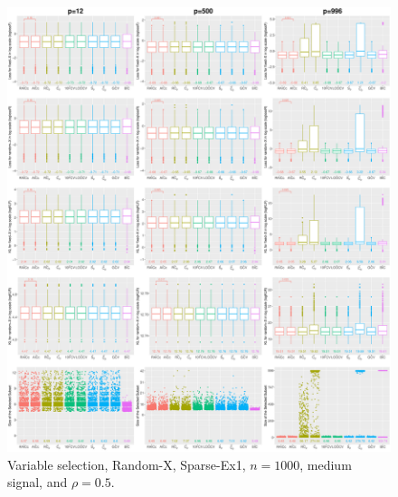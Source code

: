 \begin{figure}[!ht]
\centering
\includegraphics[width=\textwidth]{figures/supplement/randomx/subset_selection/Sparse-Ex1_n1000_msnr_rho05.eps}
\caption{Variable selection, Random-X, Sparse-Ex1, $n=1000$, medium signal, and $\rho=0.5$.}
\end{figure}
\clearpage
